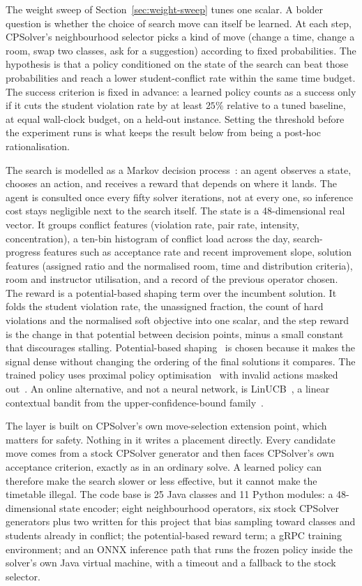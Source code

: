 \documentclass[journal]{IEEEtran}
\begin{document}
The weight sweep of Section~\ref{sec:weight-sweep} tunes one scalar. A bolder question is whether the choice of search move can itself be learned. At each step, CPSolver's neighbourhood selector picks a kind of move (change a time, change a room, swap two classes, ask for a suggestion) according to fixed probabilities. The hypothesis is that a policy conditioned on the state of the search can beat those probabilities and reach a lower student-conflict rate within the same time budget. The success criterion is fixed in advance: a learned policy counts as a success only if it cuts the student violation rate by at least $25\%$ relative to a tuned baseline, at equal wall-clock budget, on a held-out instance. Setting the threshold before the experiment runs is what keeps the result below from being a post-hoc rationalisation.

The search is modelled as a Markov decision process~\cite{sutton2018rl}: an agent observes a state, chooses an action, and receives a reward that depends on where it lands. The agent is consulted once every fifty solver iterations, not at every one, so inference cost stays negligible next to the search itself. The state is a 48-dimensional real vector. It groups conflict features (violation rate, pair rate, intensity, concentration), a ten-bin histogram of conflict load across the day, search-progress features such as acceptance rate and recent improvement slope, solution features (assigned ratio and the normalised room, time and distribution criteria), room and instructor utilisation, and a record of the previous operator chosen. The reward is a potential-based shaping term over the incumbent solution. It folds the student violation rate, the unassigned fraction, the count of hard violations and the normalised soft objective into one scalar, and the step reward is the change in that potential between decision points, minus a small constant that discourages stalling. Potential-based shaping~\cite{ng1999shaping} is chosen because it makes the signal dense without changing the ordering of the final solutions it compares. The trained policy uses proximal policy optimisation~\cite{schulman2017ppo} with invalid actions masked out~\cite{schulte2017maskable}. An online alternative, and not a neural network, is LinUCB~\cite{li2010linucb}, a linear contextual bandit from the upper-confidence-bound family~\cite{auer2002ucb}.

The layer is built on CPSolver's own move-selection extension point, which matters for safety. Nothing in it writes a placement directly. Every candidate move comes from a stock CPSolver generator and then faces CPSolver's own acceptance criterion, exactly as in an ordinary solve. A learned policy can therefore make the search slower or less effective, but it cannot make the timetable illegal. The code base is 25 Java classes and 11 Python modules: a 48-dimensional state encoder; eight neighbourhood operators, six stock CPSolver generators plus two written for this project that bias sampling toward classes and students already in conflict; the potential-based reward term; a gRPC training environment; and an ONNX inference path that runs the frozen policy inside the solver's own Java virtual machine, with a timeout and a fallback to the stock selector.
\end{document}

